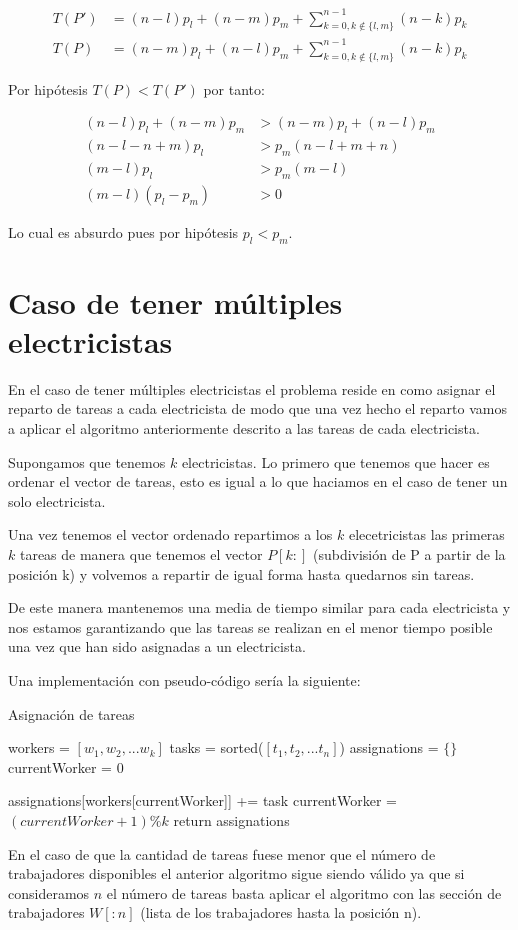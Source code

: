 \documentclass{article}
\begin{document}
\begin{align*}
  T(P') &= (n-l)p_l + (n-m)p_m + \sum_{k=0, k \notin \{l,m\}}^{n-1}(n-k)p_k \\
  T(P) &= (n-m)p_l + (n-l)p_m + \sum_{k=0, k \notin \{l,m\}}^{n-1}(n-k)p_k
\end{align*}

Por hipótesis $T(P) < T(P')$ por tanto:

\begin{align*}
  (n-l)p_l+(n-m)p_m &> (n-m)p_l + (n-l)p_m \\
  (n-l-n+m)p_l &> p_m(n-l+m+n) \\
  (m-l)p_l &> p_m(m-l) \\
  (m-l)(p_l-p_m) &> 0
\end{align*}

Lo cual es absurdo pues por hipótesis $p_l < p_m$.

\section{Caso de tener múltiples electricistas}

En el caso de tener múltiples electricistas el problema reside en como
asignar el reparto de tareas a cada electricista de modo que una vez
hecho el reparto vamos a aplicar el algoritmo anteriormente descrito a
las tareas de cada electricista.

Supongamos que tenemos $k$ electricistas. Lo primero que tenemos que
hacer es ordenar el vector de tareas, esto es igual a lo que haciamos
en el caso de tener un solo electricista.

Una vez tenemos el vector ordenado repartimos a los $k$ elecetricistas
las primeras $k$ tareas de manera que tenemos el vector $P[k:]$
(subdivisión de P a partir de la posición k) y volvemos a repartir de
igual forma hasta quedarnos sin tareas.

De este manera mantenemos una media de tiempo similar para cada
electricista y nos estamos garantizando que las tareas se realizan en
el menor tiempo posible una vez que han sido asignadas a un
electricista.

Una implementación con pseudo-código sería la siguiente:

\begin{algorithm}[H]
\caption{Asignación de tareas}
\begin{algorithmic}
\State workers = $[w_1, w_2, ... w_k]$
\State tasks = sorted($[t_1, t_2, ... t_n]$)
\State assignations = $\{\}$
\State currentWorker = 0

\State assignations[workers[currentWorker]] += task
\State currentWorker = $(currentWorker + 1) \% k$
\EndFor
\State return assignations
\EndProcedure
\end{algorithmic}
\end{algorithm}

En el caso de que la cantidad de tareas fuese menor que el número de
trabajadores disponibles el anterior algoritmo sigue siendo válido ya
que si consideramos $n$ el número de tareas basta aplicar el algoritmo
con las sección de trabajadores $W[:n]$ (lista de los trabajadores hasta
la posición n).
\end{document}
